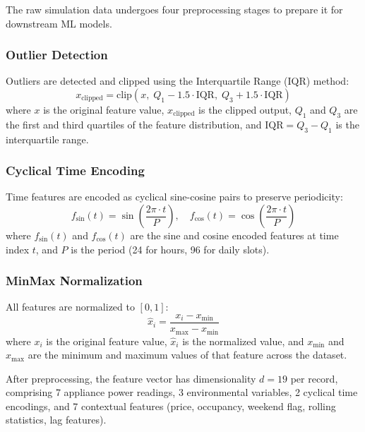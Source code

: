 \documentclass[journal]{IEEEtran}
\begin{document}
The raw simulation data undergoes four preprocessing stages to prepare it for downstream ML models.

\subsubsection{Outlier Detection} Outliers are detected and clipped using the Interquartile Range (IQR) method:
\begin{equation}
    x_{\text{clipped}} = \text{clip}\left(x, \; Q_1 - 1.5 \cdot \text{IQR}, \; Q_3 + 1.5 \cdot \text{IQR}\right)
    \label{eq:iqr}
\end{equation}
where $x$ is the original feature value, $x_{\text{clipped}}$ is the clipped output, $Q_1$ and $Q_3$ are the first and third quartiles of the feature distribution, and $\text{IQR} = Q_3 - Q_1$ is the interquartile range.

\subsubsection{Cyclical Time Encoding} Time features are encoded as cyclical sine-cosine pairs to preserve periodicity:
\begin{equation}
    f_{\sin}(t) = \sin\left(\frac{2\pi \cdot t}{P}\right), \quad f_{\cos}(t) = \cos\left(\frac{2\pi \cdot t}{P}\right)
    \label{eq:cyclical}
\end{equation}
where $f_{\sin}(t)$ and $f_{\cos}(t)$ are the sine and cosine encoded features at time index $t$, and $P$ is the period (24 for hours, 96 for daily slots).

\subsubsection{MinMax Normalization} All features are normalized to $[0, 1]$:
\begin{equation}
    \hat{x}_i = \frac{x_i - x_{\min}}{x_{\max} - x_{\min}}
    \label{eq:minmax}
\end{equation}
where $x_i$ is the original feature value, $\hat{x}_i$ is the normalized value, and $x_{\min}$ and $x_{\max}$ are the minimum and maximum values of that feature across the dataset.

After preprocessing, the feature vector has dimensionality $d = 19$ per record, comprising 7 appliance power readings, 3 environmental variables, 2 cyclical time encodings, and 7 contextual features (price, occupancy, weekend flag, rolling statistics, lag features).
\end{document}
